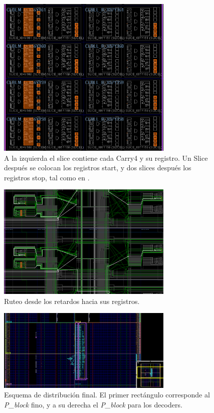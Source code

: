  \begin{figure}[H]
      \centering
      \includegraphics[width=0.75\textwidth]{imagenes/floorplan_carrys.png}
      \caption{A la izquierda el slice contiene cada Carry4 y su registro. Un Slice después se colocan
      los registros start, y dos slices después los registros stop, tal como en \cite{machado_novel_2018}.}
      \label{fig: floorplan_retardos}
 \end{figure}%
 \begin{figure}[H]
      \centering
      \includegraphics[width=0.75\textwidth]{imagenes/floorplan_routeo.png}
      \caption{Ruteo desde los retardos hacia sus registros.}
      \label{fig: ruteo}
 \end{figure}%
 \begin{figure}[H]
      \centering
      \includegraphics[width=0.75\textwidth]{imagenes/floorplan_pblocks.png}
      \caption{Esquema de distribución final. El primer rectángulo corresponde al \textit{P\_block} fino,
      y a su derecha el \textit{P\_block} para los decoders.}
      \label{fig: floorplan_pblocks}
 \end{figure}

